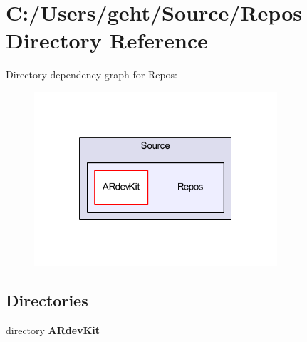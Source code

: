 \section{C\-:/\-Users/geht/\-Source/\-Repos Directory Reference}
\label{dir_58a8fb89223f4c93a95f3dadb4798d2e}
Directory dependency graph for Repos\-:
\nopagebreak
\begin{figure}[H]
\begin{center}
\leavevmode
\includegraphics[width=256pt]{dir_58a8fb89223f4c93a95f3dadb4798d2e_dep}
\end{center}
\end{figure}
\subsection*{Directories}
\begin{DoxyCompactItemize}
\item 
directory {\bf A\-Rdev\-Kit}
\end{DoxyCompactItemize}
